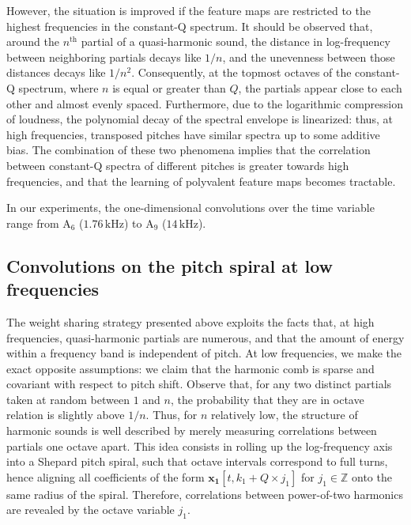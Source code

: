 \documentclass{article}
\begin{document}
However, the situation is improved if the feature maps
are restricted to the highest frequencies in the constant-Q spectrum.
It should be observed that, around the $n^{\textrm{th}}$ partial of a quasi-harmonic sound,
the distance in log-frequency between neighboring partials decays like $1/n$,
and the unevenness between those distances decays like $1/n^2$.
Consequently, at the topmost octaves of the constant-Q spectrum,
where $n$ is equal or greater than $Q$, the partials appear close to each other and almost
evenly spaced.
Furthermore, due to the logarithmic compression of loudness, the polynomial decay
of the spectral envelope is linearized: thus, at high frequencies, transposed pitches
have similar spectra up to some additive bias.
The combination of these two phenomena implies that the correlation between
constant-Q spectra of different pitches is greater towards high frequencies, and that
the learning of polyvalent feature maps becomes tractable.


In our experiments, the one-dimensional convolutions over the time variable
range from
$\mathrm{A_6}$ ($1.76\,\mathrm{kHz}$) to
$\mathrm{A_9}$ ($14\,\mathrm{kHz}$).

\subsection{Convolutions on the pitch spiral at low frequencies}
The weight sharing strategy presented above exploits the facts that,
at high frequencies, quasi-harmonic partials are numerous, and that the
amount of energy within a frequency band is independent of pitch.
At low frequencies, we make the exact opposite assumptions: we claim
that the harmonic comb is sparse and covariant with respect to pitch shift.
Observe that, for any two distinct partials taken at random between $1$ and $n$,
the probability that they are in octave relation is slightly above $1/n$.
Thus, for $n$ relatively low, the structure of harmonic sounds is well
described by merely measuring correlations between partials one octave apart.
This idea consists in rolling up the log-frequency axis into a Shepard pitch spiral,
such that octave intervals correspond to full turns, hence aligning all coefficients
of the form $\boldsymbol{x_1}[t, k_1 + Q \times j_1]$ for $j_1 \in \mathbb{Z}$
onto the same radius of the spiral.
Therefore, correlations between power-of-two harmonics are revealed by
the octave variable $j_1$.
\end{document}
